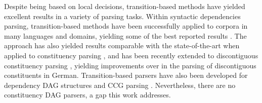 \documentclass[11pt]{article}
\newcommand{\oa}[1]{\footnote{\color{red} #1}}
\begin{document}
Despite being based on local decisions, transition-based methods have yielded excellent
results in a variety of parsing tasks. Within syntactic dependencies parsing, transition-based methods
have been successfully applied to corpora in many languages and domains, yielding some
of the best reported results \cite{dyer2015transition,ballesteros2015improved}. 
The approach has also yielded results comparable with the state-of-the-art when applied
to constituency parsing \cite{sagae2005classifier,zhu2013fast}, and has been recently extended to
discontiguous constituency parsing \cite{maier2015discontinuous},
yielding improvements over in the parsing of discontiguous constituents in German.
Transition-based parsers have also been developed for dependency DAG structures
\cite{sagae2008shift,tokgoz2015transition} and CCG parsing \cite{ambati2015incremental}.
Nevertheless, there are no constituency DAG parsers, a gap this work addresses.

%  


\end{document}

